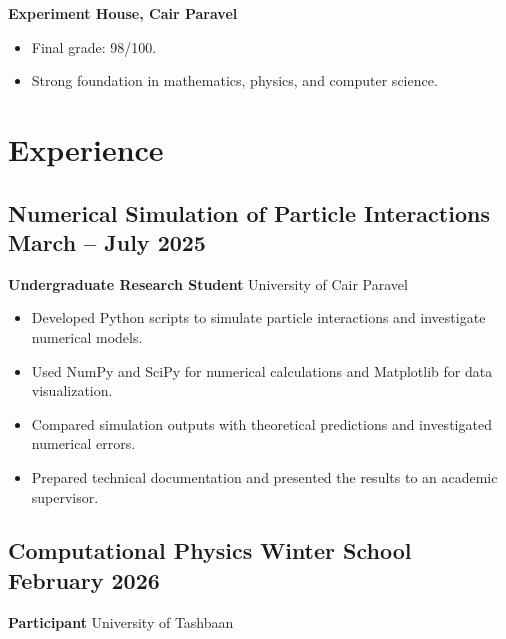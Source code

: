 \documentclass[11pt]{article}
\begin{document}
\textbf{Experiment House, Cair Paravel}

\begin{itemize}
    \item Final grade: 98/100.
    \item Strong foundation in mathematics, physics, and computer science.
\end{itemize}


\section{
    \texorpdfstring{
    \makebox[\widthof{\faGears}][c]{
        \color{NA_Red}{\faGears}
    }\quad Experience
    }
    {
    Experience
    }
}

\subsection{
    \texorpdfstring{
    Numerical Simulation of Particle Interactions
    \hfill March -- July 2025
    }
    {Numerical Simulation of Particle Interactions
    -- March -- July 2025}
}

\textbf{Undergraduate Research Student}
\hfill University of Cair Paravel

\begin{itemize}
    \item Developed Python scripts to simulate particle interactions
    and investigate numerical models.
    \item Used NumPy and SciPy for numerical calculations and
    Matplotlib for data visualization.
    \item Compared simulation outputs with theoretical predictions
    and investigated numerical errors.
    \item Prepared technical documentation and presented the results
    to an academic supervisor.
\end{itemize}

\subsection{
    \texorpdfstring{
    Computational Physics Winter School
    \hfill February 2026
    }
    {Computational Physics Winter School
    -- February 2026}
}

\textbf{Participant}
\hfill University of Tashbaan 
\end{document}
